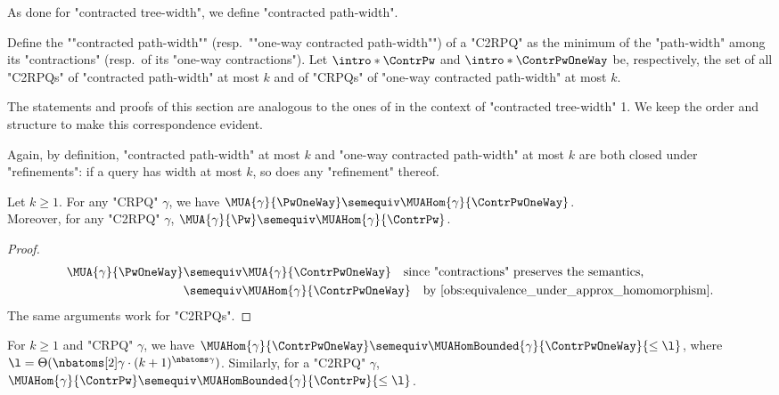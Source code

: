 As done for "contracted tree-width", we define "contracted path-width".
\begin{definition}
	\AP
	Define the ""contracted path-width"" (resp.\ ""one-way contracted path-width"")
	of a "C2RPQ" as the minimum of the "path-width" among its "contractions" (resp.\ of its "one-way contractions"). Let $\intro*\ContrPw$ and $\intro*\ContrPwOneWay$ be, respectively, the set of all "C2RPQs" of "contracted path-width" at most $k$ and of "CRPQs" of "one-way contracted path-width" at most $k$.
\end{definition}
The statements and proofs of this section are analogous to the ones of  in the context of "contracted tree-width" 1. We keep the order and structure to make this correspondence evident.

Again, by definition, "contracted path-width" at most $k$ and "one-way contracted path-width" 
at most $k$ are both closed under "refinements": if a query has width at most $k$, so does any "refinement" thereof.

\begin{fact}
	\AP\label{fact:pw-equiv-to-cpw}
	Let $k \geq 1$. For any "CRPQ" $\gamma$, we have
	$\MUA{\gamma}{\PwOneWay} \semequiv \MUAHom{\gamma}{\ContrPwOneWay}$.\\
	Moreover, for any "C2RPQ" $\gamma$,
	$\MUA{\gamma}{\Pw} \semequiv \MUAHom{\gamma}{\ContrPw}$.
\end{fact}

\begin{proof}
	\begin{align*}
		\MUA{\gamma}{\PwOneWay}
			& \semequiv \MUA{\gamma}{\ContrPwOneWay}
			\quad\text{since "contractions" preserves the semantics,} \\
			& \semequiv \MUAHom{\gamma}{\ContrPwOneWay}
			\quad\text{by \Cref{obs:equivalence_under_approx_homomorphism}.}
	\end{align*}
	The same arguments work for "C2RPQs".
\end{proof}

\begin{lemma}
    \AP\label{lemma:bound_size_refinements_pw}
    \AP For $k \geq 1$ and "CRPQ" $\gamma$, we have
    $\MUAHom{\gamma}{\ContrPwOneWay} \semequiv \MUAHomBounded{\gamma}{\ContrPwOneWay}{\leq\l}$, where
    $\l = \lbound{k}{\gamma}$.
	Similarly, for a "C2RPQ" $\gamma$,
	$\MUAHom{\gamma}{\ContrPw} \semequiv \MUAHomBounded{\gamma}{\ContrPw}{\leq\l}$.
\end{lemma}

